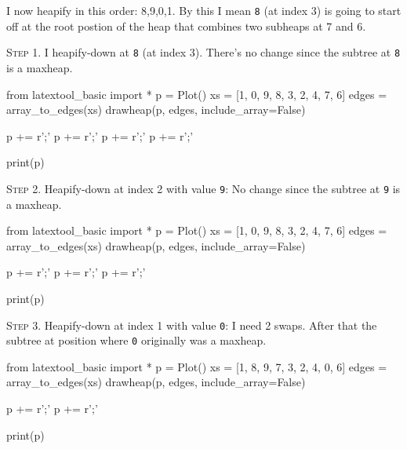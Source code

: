 I now heapify in this order: 8,9,0,1.
By this I mean \verb!8! (at index 3) is going to start off at the
root postion of the heap that combines two subheaps at 7 and 6.


\textsc{Step 1.}
I heapify-down at \texttt{8} (at index 3).
There's no change since the
subtree at \texttt{8} is a maxheap.

\begin{python}
from latextool_basic import *
p = Plot()
xs = [1, 0, 9, 8, 3, 2, 4, 7, 6]
edges = array_to_edges(xs)
drawheap(p, edges, include_array=False)

p += r'\node [ellipse, draw=red, fit=(3), line width=0.1cm, inner sep=0.0cm] {};'
p += r'\node [ellipse, draw=red, fit=(2), line width=0.1cm, inner sep=0.0cm] {};'
p += r'\node [ellipse, draw=red, fit=(4), line width=0.1cm, inner sep=0.0cm] {};'
p += r'\node [ellipse, draw=red, fit=(8) (7) (6), line width=0.1cm, inner sep=0.0cm] {};'

print(p)
\end{python}


\textsc{Step 2.}
Heapify-down at index 2 with value \texttt{9}:
No change since the subtree at \texttt{9} is a maxheap.

\begin{python}
from latextool_basic import *
p = Plot()
xs = [1, 0, 9, 8, 3, 2, 4, 7, 6]
edges = array_to_edges(xs)
drawheap(p, edges,
    include_array=False)

p += r'\node [ellipse, draw=red, fit=(3), line width=0.1cm, inner sep=0.0cm] {};'
p += r'\node [ellipse, draw=red, fit=(9) (2) (4), line width=0.1cm, inner sep=0.0cm] {};'
p += r'\node [ellipse, draw=red, fit=(8) (7) (6), line width=0.1cm, inner sep=0.0cm] {};'

print(p)
\end{python}


\textsc{Step 3.}
Heapify-down at index 1 with value \texttt{0}:
I need 2 swaps.
After that the subtree at position where \texttt{0} originally 
was a maxheap.

\begin{python}
from latextool_basic import *
p = Plot()
xs = [1, 8, 9, 7, 3, 2, 4, 0, 6]
edges = array_to_edges(xs)
drawheap(p, edges,
    include_array=False)

p += r'\node [ellipse, draw=red, fit=(9) (2) (4), line width=0.1cm, inner sep=0.0cm] {};'
p += r'\node [ellipse, draw=red, fit=(3) (0) (8) (7) (6), line width=0.1cm, inner sep=0.0cm] {};'

print(p)
\end{python}

